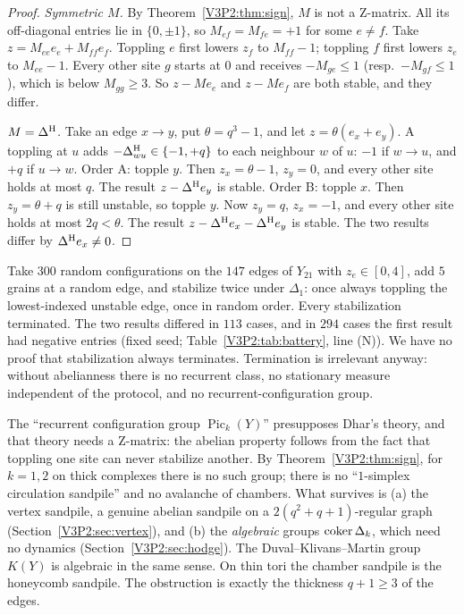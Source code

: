 \begin{proof}
\emph{Symmetric $M$.} By Theorem~\ref{V3P2:thm:sign}, $M$ is not a Z-matrix. All its
off-diagonal entries lie in $\{0,\pm1\}$, so $M_{ef}=M_{fe}=+1$ for some $e\neq f$. Take
$z=M_{ee}e_e+M_{ff}e_f$. Toppling $e$ first lowers $z_f$ to $M_{ff}-1$; toppling $f$ first
lowers $z_e$ to $M_{ee}-1$. Every other site $g$ starts at $0$ and receives $-M_{ge}\le1$
(resp.\ $-M_{gf}\le1$), which is below $M_{gg}\ge3$. So $z-Me_e$ and $z-Me_f$ are both stable,
and they differ.

\emph{$M=\Delta^{\mathrm{H}}$.} Take an edge $x\to y$, put $\theta=q^{3}-1$, and let $z=\theta(e_x+e_y)$.
A toppling at $u$ adds $-\Delta^{\mathrm{H}}_{wu}\in\{-1,+q\}$ to each neighbour $w$ of $u$: $-1$ if
$w\to u$, and $+q$ if $u\to w$.
Order A: topple $y$. Then $z_x=\theta-1$, $z_y=0$, and every other site holds at most $q$.
The result $z-\Delta^{\mathrm{H}} e_y$ is stable.
Order B: topple $x$. Then $z_y=\theta+q$ is still unstable, so topple $y$. Now $z_y=q$,
$z_x=-1$, and every other site holds at most $2q<\theta$. The result
$z-\Delta^{\mathrm{H}} e_x-\Delta^{\mathrm{H}} e_y$ is stable.
The two results differ by $\Delta^{\mathrm{H}} e_x\neq0$.
\end{proof}

\begin{remark}[Numerics on $Y_{21}$]\label{V3P2:rem:numerics}
Take $300$ random configurations on the $147$ edges of $Y_{21}$ with $z_e\in[0,4]$, add $5$
grains at a random edge, and stabilize twice under $\Delta_1$: once always toppling the
lowest-indexed unstable edge, once in random order. Every stabilization terminated. The two
results differed in $113$ cases, and in $294$ cases the first result had negative entries
(fixed seed; Table~\ref{V3P2:tab:battery}, line (N)). We have no proof that stabilization
always terminates. Termination is irrelevant anyway: without abelianness there is no
recurrent class, no stationary measure independent of the protocol, and no
recurrent-configuration group.
\end{remark}

\begin{remark}\label{V3P2:rem:meaning}
The ``recurrent configuration group $\operatorname{Pic}_k(Y)$'' presupposes Dhar's theory,
and that theory needs a Z-matrix: the abelian property follows from the fact that toppling
one site can never stabilize another. By Theorem~\ref{V3P2:thm:sign}, for $k=1,2$ on thick
complexes there is no such group; there is no ``$1$-simplex circulation sandpile'' and no
avalanche of chambers. What survives is (a) the vertex sandpile, a genuine abelian sandpile
on a $2(q^{2}+q+1)$-regular graph (Section~\ref{V3P2:sec:vertex}), and (b) the \emph{algebraic}
groups $\operatorname{coker}\Delta_k$, which need no dynamics (Section~\ref{V3P2:sec:hodge}). The
Duval--Klivans--Martin group $K(Y)$ \cite{DKM} is algebraic in the same sense. On thin tori
the chamber sandpile is the honeycomb sandpile. The obstruction is exactly the thickness
$q+1\ge3$ of the edges.
\end{remark}

